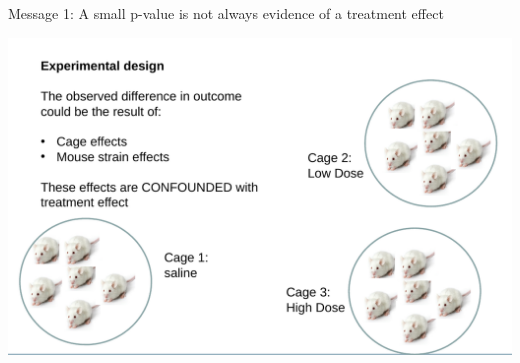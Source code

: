 \documentclass[10pt]{beamer}
\begin{document}
\begin{frame}{Message 1: A small p-value is not always evidence of a treatment effect}
\pause
 \vspace{-0.2cm}
 \begin{center}
  \includegraphics[width=\textwidth]{Figures/mice}
 \end{center}
 
\end{frame}
\end{document}
